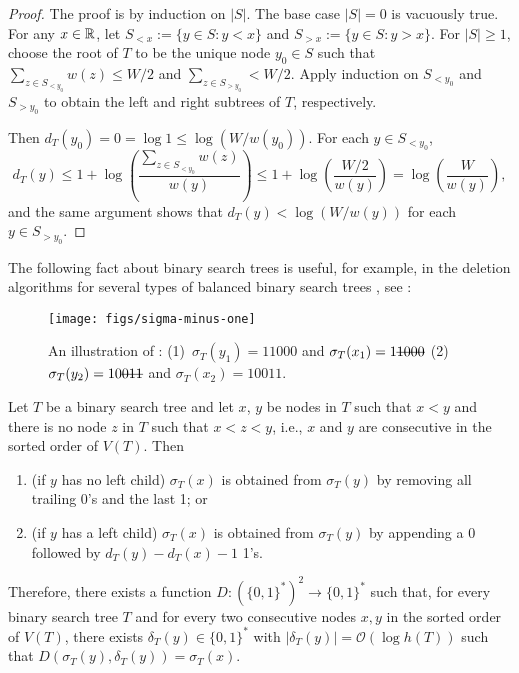 \documentclass[kpfonts]{patmorin}
\newcommand{\Oh}{\mathcal{O}}
\let\le\leqslant
\let\ge\geqslant
\begin{document}
\begin{proof}
  The proof is by induction on $|S|$. The base case $|S|=0$ is vacuously true.
  For any $x\in\mathbb{R}$, let $S_{<x}:=\{y\in S: y < x\}$ and $S_{>x}:=\{y\in S: y>x\}$. For $|S|\ge 1$, choose the root of $T$ to be the unique node $y_0\in S$ such that $\sum_{z\in S_{<y_0}} w(z)\le W/2$ and $\sum_{z\in S_{>y_0}}< W/2$. Apply induction on $S_{<y_0}$ and $S_{>y_0}$ to obtain the left and right subtrees of $T$, respectively.

  Then $d_T(y_0)=0=\log 1\le \log (W/w(y_0))$.  For each $y\in S_{<y_0}$,
  \[
    d_T(y) \le 1 + \log\left(\frac{\sum_{z\in S_{<y_0}}w(z)}{w(y)}\right)
            \le 1 + \log \left(\frac{W/2}{w(y)}\right)
            = \log \left(\frac{W}{w(y)}\right) ,
  \]
  and the same argument shows that $d_T(y) < \log (W/w(y))$ for each $y\in S_{>y_0}$.
\end{proof}

The following fact about binary search trees is useful, for example, in the deletion algorithms for several types of balanced binary search trees \cite[Section~6.2.3]{morin:open}, see :

\begin{figure}
  \begin{center}
    \texttt{[image: figs/sigma-minus-one]}
  \end{center}
  \caption{An illustration of : (1)~$\sigma_T(y_1)=11000$ and $\sigma_T(x_1)=1\mbox{\sout{1000}}$ (2)~$\sigma_T(y_2)=10\mbox{\sout{011}}$ and $\sigma_T(x_2)=10011$.}
\end{figure}

\begin{obs}
  Let $T$ be a binary search tree and let $x$, $y$ be nodes in $T$ such that $x<y$ and there is no node $z$ in $T$ such that $x<z<y$, i.e., $x$ and $y$ are consecutive in the sorted order of $V(T)$.  Then
  \begin{enumerate}
    \item (if $y$ has no left child) $\sigma_T(x)$ is obtained from $\sigma_T(y)$ by removing all trailing 0's and the last 1; or
    \item (if $y$ has a left child) $\sigma_T(x)$ is obtained from $\sigma_T(y)$ by appending a 0 followed by $d_T(y)-d_T(x)-1$ 1's.
  \end{enumerate}
Therefore, there exists a function $D:(\{0,1\}^*)^2\to\{0,1\}^*$ such that, for every binary search tree $T$ and for every two consecutive nodes $x, y$ in the sorted order of $V(T)$, there exists $\delta_T(y) \in \{0,1\}^*$ with $|\delta_T(y)|=\Oh(\log h(T))$ such that
$D(\sigma_T(y),\delta_T(y))=\sigma_T(x)$.
\end{obs}
\end{document}
